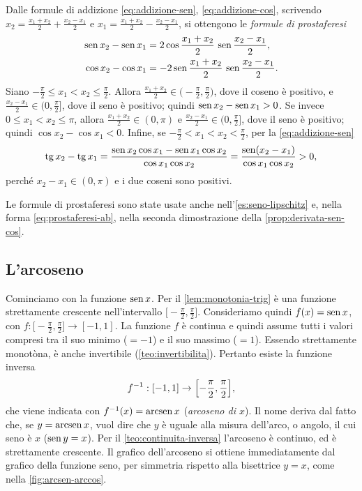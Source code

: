 \begin{dimostrazione}
Dalle formule di addizione \eqref{eq:addizione-sen}, \eqref{eq:addizione-cos}, scrivendo
$x_{2}=\frac{x_{1}+x_{2}}2+\frac{x_{2}-x_{1}}2$ e $x_{1}=\frac{x_{1}+x_{2}}2-\frac{x_{2}-x_{1}}2$,
si ottengono le \emph{formule di prostaferesi}
\begin{equation}\label{eq:prostaferesi}
\begin{aligned}
  \operatorname{sen} x_{2}-\operatorname{sen} x_{1}&=2\cos\frac{x_{1}+x_{2}}2\,\operatorname{sen}\frac{x_{2}-x_{1}}2,\\
  \cos x_{2}-\cos x_{1}&=-2\operatorname{sen}\frac{x_{1}+x_{2}}2\,\operatorname{sen}\frac{x_{2}-x_{1}}2 .
\end{aligned}
\end{equation}
Siano $-\frac\pi2\le x_{1}<x_{2}\le\frac\pi2$. Allora $\frac{x_{1}+x_{2}}2\in
\bigl(-\frac\pi2,\frac\pi2\bigr)$, dove il coseno è positivo, e $\frac{x_{2}-x_{1}}2\in
\bigl(0,\frac\pi2\bigr]$, dove il seno è positivo; quindi $\operatorname{sen} x_{2}-\operatorname{sen} x_{1}>0$. Se invece
$0\le x_{1}<x_{2}\le\pi$, allora $\frac{x_{1}+x_{2}}2\in(0,\pi)$ e
$\frac{x_{2}-x_{1}}2\in\bigl(0,\frac\pi2\bigr]$, dove il seno è positivo; quindi
$\cos x_{2}-\cos x_{1}<0$. Infine, se $-\frac\pi2<x_{1}<x_{2}<\frac\pi2$, per la
\eqref{eq:addizione-sen}
\[
  \operatorname{tg} x_{2}-\operatorname{tg} x_{1}=\frac{\operatorname{sen} x_{2}\cos x_{1}-\operatorname{sen} x_{1}\cos x_{2}}{\cos x_{1}\cos x_{2}}
  =\frac{\operatorname{sen}(x_{2}-x_{1})}{\cos x_{1}\cos x_{2}}>0,
\]
perché $x_{2}-x_{1}\in(0,\pi)$ e i due coseni sono positivi.
\end{dimostrazione}

Le formule di prostaferesi sono state usate anche nell'\cref{es:seno-lipschitz} e, nella
forma \eqref{eq:prostaferesi-ab}, nella seconda dimostrazione della
\cref{prop:derivata-sen-cos}.

\subsection{L'arcoseno}

Cominciamo con la funzione $\operatorname{sen} x$. Per il \cref{lem:monotonia-trig} è una funzione
strettamente crescente nell'intervallo $\bigl[-\frac\pi2,\frac\pi2\bigr]$. Consideriamo quindi
$f(x)=\operatorname{sen} x$, con $f:\bigl[-\frac\pi2,\frac\pi2\bigr]\to[-1,1]$. La funzione $f$ è continua e
quindi assume tutti i valori compresi tra il suo minimo ($=-1$) e il suo massimo ($=1$).
Essendo strettamente monotòna, è anche invertibile (\cref{teo:invertibilita}). Pertanto
esiste la funzione inversa
\[
  f^{-1}:[-1,1]\to\Bigl[-\frac\pi2,\frac\pi2\Bigr],
\]
che viene indicata con $f^{-1}(x)=\operatorname{arcsen} x$ (\emph{arcoseno di $x$}). Il nome deriva dal
fatto che, se $y=\operatorname{arcsen} x$, vuol dire che $y$ è uguale alla misura dell'arco, o angolo,
il cui seno è $x$ ($\operatorname{sen} y=x$). Per il \cref{teo:continuita-inversa} l'arcoseno è
continuo, ed è strettamente crescente. Il grafico dell'arcoseno si ottiene
immediatamente dal grafico della funzione seno, per simmetria rispetto alla bisettrice
$y=x$, come nella \cref{fig:arcsen-arccos}.

